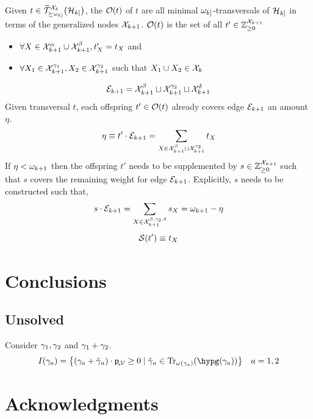 \documentclass[aps, 10pt, english, twoside, twocolumn, pra, nofootinbib, tightenlines, longbibliography, superscriptaddress]{revtex4-1}
\begin{document}
    \begin{definition}
        Given $t \in \widetilde {\s T}_{\succeq \w_{k]}}^{\s X_{k}}\br{\s H_{k]}}$, the  $\s O\br{t}$ of $t$ are all minimal $\omega_{k]}$-transversals of $\mathcal{H}_{k]}$ in terms of the generalized nodes $\mathcal{X}_{k+1}$. $\s O\br{t}$ is the set of all $t' \in {\mathbb{Z}}_{\geq 0}^{\mathcal{X}_{k+1}}$
        \begin{itemize}
            \item $\forall X \in \mathcal{X}_{k+1}^{\alpha} \cup \mathcal{X}_{k+1}^{\beta}, t'_{X} = t_{X}$ and
            \item $\forall X_1 \in \mathcal{X}_{k+1}^{\gamma_1}, X_2 \in \mathcal{X}_{k+1}^{\gamma_2}$ such that $X_1 \cup X_2 \in \mathcal{X}_{k}$
        \end{itemize}
    \end{definition}
    \[ \mathcal{E}_{k+1} = \mathcal{X}_{k+1}^{\beta} \sqcup \mathcal{X}_{k+1}^{\gamma_2} \sqcup \mathcal{X}_{k+1}^{\delta} \]
    Given transversal $t$, each offspring $t' \in \s O\br{t}$ already covers edge $\mathcal{E}_{k+1}$ an amount $\eta$.
    \[ \eta \equiv t' \cdot \mathcal{E}_{k+1} = \sum_{X \in \mathcal{X}_{k+1}^{\beta} \sqcup \mathcal{X}_{k+1}^{\gamma_2}} t_X \]
    If $\eta < \omega_{k+1}$ then the offspring $t'$ needs to be supplemented by $s \in {\mathbb{Z}}_{\geq 0}^{\mathcal{X}_{k+1}}$ such that $s$ covers the remaining weight for edge $\mathcal{E}_{k+1}$. Explicitly, $s$ needs to be constructed such that,
    \[ s \cdot \mathcal{E}_{k+1} = \sum_{X \in \mathcal{X}_{k+1}^{\beta, \gamma_2, \delta}} s_{X} = \omega_{k+1} - \eta  \]
    \[ \s S\br{t'} \defined  t_X \]


    \section{Conclusions}

    \subsection{Unsolved}
    Consider $\gamma_{1}, \gamma_{2}$ and $\gamma_{1} + \gamma_{2}$.
    \[ I\br{\ga_a} = \bc{\br{\ga_{a} + \ti \ga_{a}} \cdot \prob{\mscenariowrap} \geq 0 \mid \ti \ga_{a} \in \transversals{\w\br{\ga_a}}{\hypg\br{\ga_a}}} \quad a = 1,2 \]

    \section*{Acknowledgments}

    \setlength{\bibsep}{3pt plus 3pt minus 2pt}
    
    \nocite{apsrev41Control}
    
\end{document}

